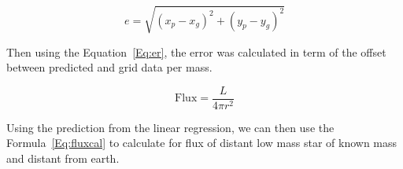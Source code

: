 \begin{equation}
    e=\sqrt{(x_p-x_g)^2+(y_p-y_g)^2}
    \label{Eq:er}
\end{equation}

Then using the Equation~\ref{Eq:er}, the error was calculated in term of the offset between predicted and grid data per mass.

\begin{equation}
    \mathrm{Flux}=\frac{L}{4\pi r^2}
    \label{Eq:fluxcal}
\end{equation}

Using the prediction from the linear regression, we can then use the Formula~\ref{Eq:fluxcal} to calculate for flux of distant low mass star of known mass and distant from earth.
 